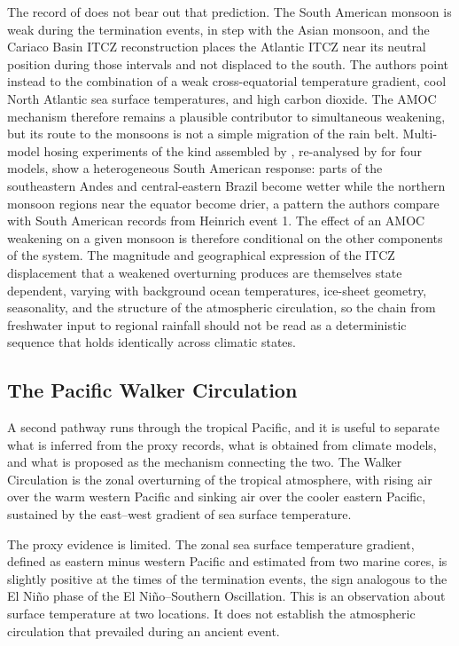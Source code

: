 \documentclass[11pt]{article}
\theoremstyle{definition}
\begin{document}
The record of \citeauthor{olson2026} does not bear out that prediction. The South American monsoon is weak during the termination events, in step with the Asian monsoon, and the Cariaco Basin ITCZ reconstruction places the Atlantic ITCZ near its neutral position during those intervals and not displaced to the south. The authors point instead to the combination of a weak cross-equatorial temperature gradient, cool North Atlantic sea surface temperatures, and high carbon dioxide. The AMOC mechanism therefore remains a plausible contributor to simultaneous weakening, but its route to the monsoons is not a simple migration of the rain belt. Multi-model hosing experiments of the kind assembled by \citet{benyami2024}, re-analysed by \citeauthor{olson2026} for four models, show a heterogeneous South American response: parts of the southeastern Andes and central-eastern Brazil become wetter while the northern monsoon regions near the equator become drier, a pattern the authors compare with South American records from Heinrich event 1. The effect of an AMOC weakening on a given monsoon is therefore conditional on the other components of the system. The magnitude and geographical expression of the ITCZ displacement that a weakened overturning produces are themselves state dependent, varying with background ocean temperatures, ice-sheet geometry, seasonality, and the structure of the atmospheric circulation, so the chain from freshwater input to regional rainfall should not be read as a deterministic sequence that holds identically across climatic states.

\subsection{The Pacific Walker Circulation}

A second pathway runs through the tropical Pacific, and it is useful to separate what is inferred from the proxy records, what is obtained from climate models, and what is proposed as the mechanism connecting the two. The Walker Circulation is the zonal overturning of the tropical atmosphere, with rising air over the warm western Pacific and sinking air over the cooler eastern Pacific, sustained by the east--west gradient of sea surface temperature.

The proxy evidence is limited. The zonal sea surface temperature gradient, defined as eastern minus western Pacific and estimated from two marine cores, is slightly positive at the times of the termination events, the sign analogous to the El Ni\~no phase of the El Ni\~no--Southern Oscillation. This is an observation about surface temperature at two locations. It does not establish the atmospheric circulation that prevailed during an ancient event.
\end{document}
